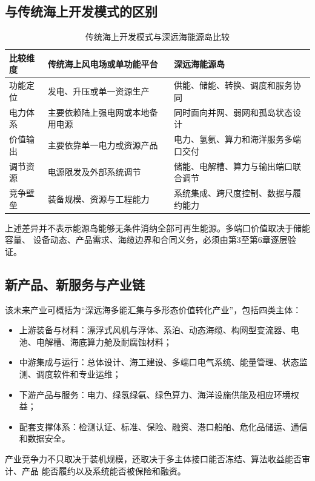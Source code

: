 \subsection{与传统海上开发模式的区别}

\begin{table}[H]
\centering
\caption{传统海上开发模式与深远海能源岛比较}
\label{tab:c2-traditional-compare}
\begin{tabularx}{\textwidth}{p{2.3cm} X X}
\toprule
比较维度 & 传统海上风电场或单功能平台 & 深远海能源岛\\
\midrule
功能定位 & 发电、升压或单一资源生产 & 供能、储能、转换、调度和服务协同\\
电力体系 & 主要依赖陆上强电网或本地备用电源 & 同时面向并网、弱网和孤岛状态设计\\
价值输出 & 主要依靠单一电力或资源产品 & 电力、氢氨、算力和海洋服务多端口交付\\
调节资源 & 电源限发及外部系统调节 & 储能、电解槽、算力与输出端口联合调节\\
竞争壁垒 & 装备规模、资源与工程能力 & 系统集成、跨尺度控制、数据与履约能力\\
\bottomrule
\end{tabularx}
\end{table}

上述差异并不表示能源岛能够无条件消纳全部可再生能源。多端口价值取决于储能容量、
设备动态、产品需求、海缆边界和合同义务，必须由第3至第6章逐层验证。

\subsection{新产品、新服务与产业链}

该未来产业可概括为“深远海多能汇集与多形态价值转化产业”，包括四类主体：
\begin{itemize}
  \item 上游装备与材料：漂浮式风机与浮体、系泊、动态海缆、构网型变流器、电池、电解槽、海底算力舱及耐腐蚀材料；
  \item 中游集成与运行：总体设计、海工建设、多端口电气系统、能量管理、状态监测、调度软件和专业运维；
  \item 下游产品与服务：电力、绿氢绿氨、绿色算力、海洋设施供能及相应环境权益；
  \item 配套支撑体系：检测认证、标准、保险、融资、港口船舶、危化品储运、通信和数据安全。
\end{itemize}

产业竞争力不只取决于装机规模，还取决于多主体接口能否冻结、算法收益能否审计、产品
能否履约以及系统能否被保险和融资。

